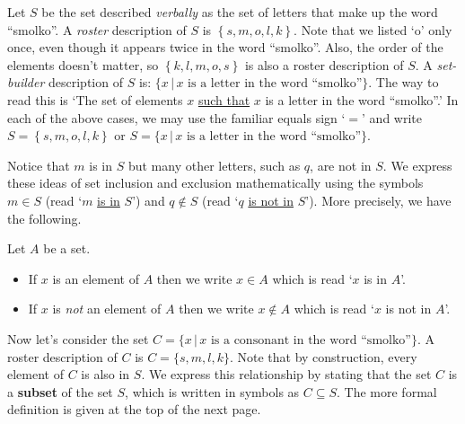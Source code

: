 \medskip

Let $S$ be the set described \textit{verbally} as the set of letters that make up the word ``smolko''.  A  \emph{roster} description of $S$ is $\left\{ s, m, o, l, k \right\}$. Note that we listed `o' only once, even though it appears twice in the word ``smolko''.  Also, the order of the elements doesn't matter, so $\left\{ k,  l,  m, o, s \right\}$ is also a roster description of $S$.  A \emph{set-builder} description of $S$ is: $\{ x \, | \, \mbox{$x$ is a letter in the word ``smolko''}\}$.  The way to read this is `The set of elements $x$ \underline{such that} $x$ is a letter in the word ``smolko''.'   In each of the above cases, we may use the familiar equals sign `$=$' and write  $S = \left\{ s, m, o, l, k \right\}$ or $S = \{ x \, | \, \mbox{$x$ is a letter in the word ``smolko''}\}$.  

\smallskip

Notice that  $m$ is in $S$ but many other letters, such as $q$, are not in $S$.  We express these ideas of set inclusion and exclusion mathematically using the symbols $m \in S$ (read `$m$ \underline{is in} $S$') and $q \notin S$ (read `$q$ \underline{is not in} $S$').  More precisely, we have the following.

\medskip

\colorbox{ResultColor}{\bbm

\begin{defn} \label{notationforsetinclusion}  Let $A$ be a set.

\begin{itemize}

\item If $x$ is an element of $A$ then we write $x \in A$\index{$\in$} which is read `$x$ is in $A$'.

\item If $x$ is \emph{not} an element of $A$ then we write $x \notin A$\index{$\notin$} which is read `$x$ is not in $A$'.

\end{itemize}

\end{defn}

\ebm}

\medskip

Now let's consider the set $C =  \{ x \, | \, \mbox{$x$ is a consonant in the word ``smolko''}\}$.  A roster description of $C$ is  $C = \{ s, m, l, k\}$.  Note that by construction, every element of $C$ is also in $S$.  We express this relationship by stating that the set $C$ is a \textbf{subset} of the set $S$, which is written in symbols as $C \subseteq S$.  The more formal definition is given at the top of the next page.

